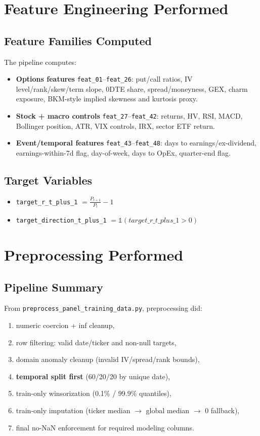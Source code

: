 \documentclass[11pt]{article}
\begin{document}
\section{Feature Engineering Performed}

\subsection{Feature Families Computed}
The pipeline computes:
\begin{itemize}[leftmargin=1.2em]
  \item \textbf{Options features} \texttt{feat\_01}--\texttt{feat\_26}: put/call ratios, IV level/rank/skew/term slope, 0DTE share, spread/moneyness, GEX, charm exposure, BKM-style implied skewness and kurtosis proxy.
  \item \textbf{Stock + macro controls} \texttt{feat\_27}--\texttt{feat\_42}: returns, HV, RSI, MACD, Bollinger position, ATR, VIX controls, IRX, sector ETF return.
  \item \textbf{Event/temporal features} \texttt{feat\_43}--\texttt{feat\_48}: days to earnings/ex-dividend, earnings-within-7d flag, day-of-week, days to OpEx, quarter-end flag.
\end{itemize}

\subsection{Target Variables}
\begin{itemize}[leftmargin=1.2em]
  \item \texttt{target\_r\_t\_plus\_1} $= \frac{P_{t+1}}{P_t} - 1$
  \item \texttt{target\_direction\_t\_plus\_1} $= \mathbb{1}(target\_r\_t\_plus\_1 > 0)$
\end{itemize}

\section{Preprocessing Performed}

\subsection{Pipeline Summary}
From \texttt{preprocess\_panel\_training\_data.py}, preprocessing did:
\begin{enumerate}[leftmargin=1.2em]
  \item numeric coercion + inf cleanup,
  \item row filtering: valid date/ticker and non-null targets,
  \item domain anomaly cleanup (invalid IV/spread/rank bounds),
  \item \textbf{temporal split first} (60/20/20 by unique date),
  \item train-only winsorization (0.1\% / 99.9\% quantiles),
  \item train-only imputation (ticker median $\rightarrow$ global median $\rightarrow$ 0 fallback),
  \item final no-NaN enforcement for required modeling columns.
\end{enumerate}
\end{document}
